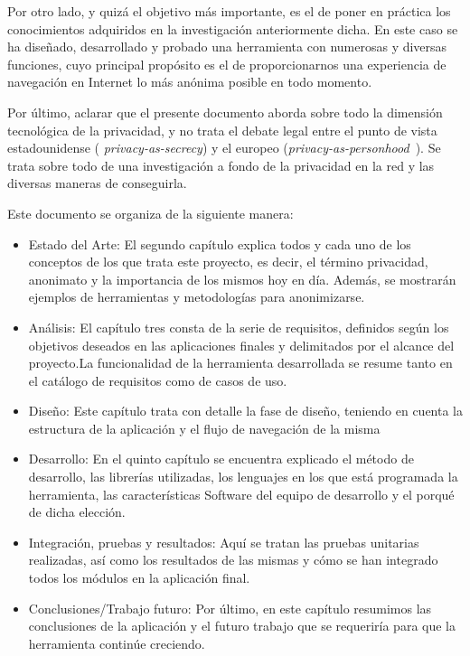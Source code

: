 Por otro lado, y quizá el objetivo más importante, es el de poner en
práctica los conocimientos adquiridos en la investigación
anteriormente dicha. En este caso se ha diseñado, desarrollado y
probado una herramienta con numerosas y diversas funciones, cuyo
principal propósito es el de proporcionarnos una experiencia
  de navegación en Internet lo más
anónima posible en todo momento.

Por último, aclarar que el presente documento aborda sobre todo la dimensión tecnológica de la privacidad, y no trata el debate legal entre el punto de vista estadounidense ( \textit{privacy-as-secrecy}) y el europeo (\textit{privacy-as-personhood}~\cite{solove2002conceptualizing}). Se trata sobre todo de una investigación a fondo de la privacidad en la red y las diversas maneras de conseguirla.





Este documento se organiza de la siguiente manera:
\begin{itemize}
	\item Estado  del  Arte: El segundo capítulo explica todos y cada uno de los conceptos de los que trata este proyecto, es decir, el término privacidad, anonimato y la importancia de los mismos hoy en día. Además, se mostrarán ejemplos de herramientas y metodologías para anonimizarse. 
	\item Análisis: El capítulo tres consta de la serie de requisitos, definidos  según  los objetivos  deseados  en  las  aplicaciones  finales  y  delimitados  por  el  alcance  del proyecto.La funcionalidad de la herramienta desarrollada se resume tanto en el catálogo de requisitos como de casos de uso.
	\item Diseño: Este capítulo trata con detalle la fase de diseño, teniendo en cuenta la estructura de la aplicación y el flujo de navegación de la misma 
	\item Desarrollo: En el quinto capítulo se encuentra explicado el método de desarrollo, las librerías utilizadas, los lenguajes en los que está programada la herramienta, las características Software del equipo de desarrollo y el porqué de dicha elección.
	\item Integración, pruebas y resultados: Aquí se tratan las pruebas unitarias realizadas, así como los resultados de las mismas y cómo se han integrado todos los módulos en la aplicación final.
	\item Conclusiones/Trabajo  futuro: Por último, en este capítulo resumimos las conclusiones de la aplicación y el futuro trabajo que se requeriría para que la herramienta continúe creciendo.
\end{itemize}

\newpage \thispagestyle{empty} %